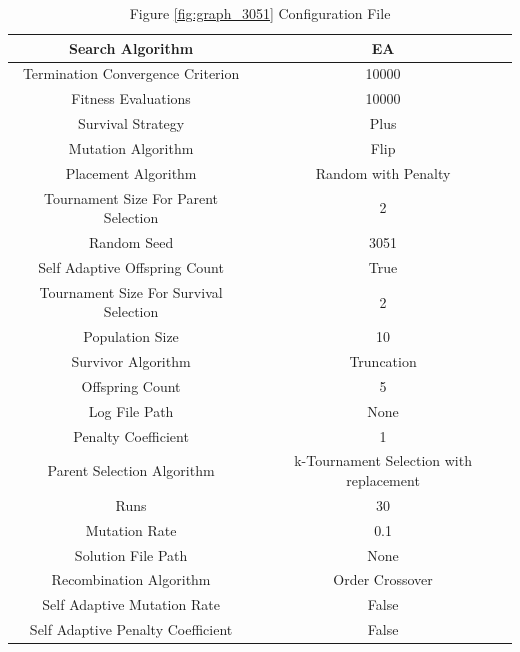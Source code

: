 \documentclass{standalone}
\begin{document}
\clearpage
\begin{table}[!htb]
	\centering
	\caption{Figure \ref{fig:graph_3051} Configuration File}
	\label{tab:graph_3051}
	\begin{tabular}{| c | c |}
		\hline
		Search Algorithm		& EA		 \\
		\hline
		Termination Convergence Criterion		& 10000		 \\
		\hline
		Fitness Evaluations		& 10000		 \\
		\hline
		Survival Strategy		& Plus		 \\
		\hline
		Mutation Algorithm		& Flip		 \\
		\hline
		Placement Algorithm		& Random with Penalty		 \\
		\hline
		Tournament Size For Parent Selection		& 2		 \\
		\hline
		Random Seed		& 3051		 \\
		\hline
		Self Adaptive Offspring Count		& True		 \\
		\hline
		Tournament Size For Survival Selection		& 2		 \\
		\hline
		Population Size		& 10		 \\
		\hline
		Survivor Algorithm		& Truncation		 \\
		\hline
		Offspring Count		& 5		 \\
		\hline
		Log File Path		& None		 \\
		\hline
		Penalty Coefficient		& 1		 \\
		\hline
		Parent Selection Algorithm		& k-Tournament Selection with replacement		 \\
		\hline
		Runs		& 30		 \\
		\hline
		Mutation Rate		& 0.1		 \\
		\hline
		Solution File Path		& None		 \\
		\hline
		Recombination Algorithm		& Order Crossover		 \\
		\hline
		Self Adaptive Mutation Rate		& False		 \\
		\hline
		Self Adaptive Penalty Coefficient		& False		 \\
		\hline
	\end{tabular}
\end{table}
\end{document}
